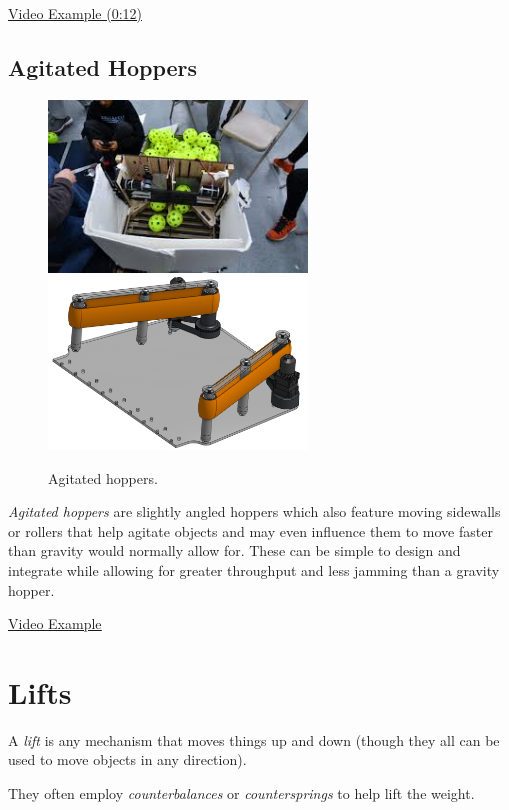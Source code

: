 \documentclass[10pt,letterpaper]{book}
\begin{document}
\href{https://youtu.be/ewTCvLp5EUo?t=12}{\color{red}\underline{Video Example (0:12)}}
\subsection{Agitated Hoppers}

\begin{figure}[H]
	\includegraphics[height=1.8in]{imgs/hopper_agitated_1.jpeg}
	\includegraphics[height=1.8in]{imgs/hopper_agitated_2.png}
	\caption{Agitated hoppers.}
\end{figure}

\textit{Agitated hoppers} are slightly angled hoppers which also feature moving sidewalls or rollers that help agitate objects and may even influence them to move faster than gravity would normally allow for. These can be simple to design and integrate while allowing for greater throughput and less jamming than a gravity hopper. 

\href{https://www.youtube.com/watch?v=9vIrTnXu7ho}{\color{red}\underline{Video Example}}
\section{Lifts}

A \textit{lift} is any mechanism that moves things up and down (though they all can be used to move objects in any direction). 

They often employ \textit{counterbalances} or \textit{countersprings} to help lift the weight.
\end{document}
